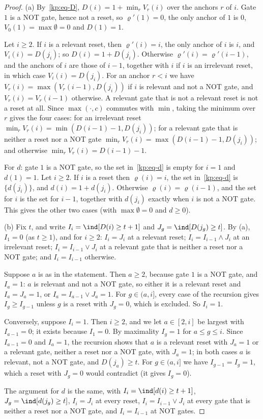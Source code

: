 \documentclass[11pt]{amsart}
\theoremstyle{definition}
\theoremstyle{remark}
\begin{document}
\begin{proof}
(a) By~\eqref{kp:eq-D}, $D(i)=1+\min_r V_r(i)$ over the anchors $r$ of $i$.
Gate $1$ is a NOT gate, hence not a reset, so $\varrho'(1)=0$, the only anchor
of $1$ is $0$, $V_0(1)=\max\emptyset=0$ and $D(1)=1$.

Let $i\ge 2$. If $i$ is a relevant reset, then $\varrho'(i)=i$, the only anchor
of $i$ is $i$, and $V_i(i)=D(j_i)$; so $D(i)=1+D(j_i)$. Otherwise
$\varrho'(i)=\varrho'(i-1)$, and the anchors of $i$ are those of $i-1$, together
with $i$ if $i$ is an irrelevant reset, in which case $V_i(i)=D(j_i)$. For an
anchor $r<i$ we have $V_r(i)=\max(V_r(i-1),D(j_i))$ if $i$ is relevant and not
a NOT gate, and $V_r(i)=V_r(i-1)$ otherwise. A relevant gate that is not a
relevant reset is not a reset at all. Since $\max(\cdot,c)$ commutes with
$\min$, taking the minimum over $r$ gives the four cases: for an irrelevant
reset $\min_r V_r(i)=\min(D(i-1)-1,D(j_i))$; for a relevant gate that is
neither a reset nor a NOT gate $\min_r V_r(i)=\max(D(i-1)-1,D(j_i))$; and
otherwise $\min_r V_r(i)=D(i-1)-1$.

For $d$: gate $1$ is a NOT gate, so the set in~\eqref{kp:eq-d} is empty for
$i=1$ and $d(1)=1$. Let $i\ge 2$. If $i$ is a reset then $\varrho(i)=i$, the
set in~\eqref{kp:eq-d} is $\{d(j_i)\}$, and $d(i)=1+d(j_i)$. Otherwise
$\varrho(i)=\varrho(i-1)$, and the set for $i$ is the set for $i-1$, together
with $d(j_i)$ exactly when $i$ is not a NOT gate. This gives the other two
cases (with $\max\emptyset=0$ and $d\ge 0$).

(b) Fix $t$, and write $I_i=\ind[D(i)\ge t+1]$ and $J_g=\ind[D(j_g)\ge t]$. By
(a), $I_1=0$ (as $t\ge 1$), and for $i\ge 2$:
$I_i=J_i$ at a relevant reset; $I_i=I_{i-1}\wedge J_i$ at an irrelevant reset;
$I_i=I_{i-1}\vee J_i$ at a relevant gate that is neither a reset nor a NOT
gate; and $I_i=I_{i-1}$ otherwise.

Suppose $a$ is as in the statement. Then $a\ge 2$, because gate $1$ is a NOT
gate, and $I_a=1$: $a$ is relevant and not a NOT gate, so either it is a
relevant reset and $I_a=J_a=1$, or $I_a=I_{a-1}\vee J_a=1$. For $g\in(a,i]$,
every case of the recursion gives $I_g\ge I_{g-1}$ unless $g$ is a reset with
$J_g=0$, which is excluded. So $I_i=1$.

Conversely, suppose $I_i=1$. Then $i\ge 2$, and we let $a\in[2,i]$ be largest
with $I_{a-1}=0$; it exists because $I_1=0$. By maximality $I_g=1$ for
$a\le g\le i$. Since $I_{a-1}=0$ and $I_a=1$, the recursion shows that $a$ is a
relevant reset with $J_a=1$ or a relevant gate, neither a reset nor a NOT gate,
with $J_a=1$; in both cases $a$ is relevant, not a NOT gate, and
$D(j_a)\ge t$. For $g\in(a,i]$ we have $I_{g-1}=I_g=1$, which a reset with
$J_g=0$ would contradict (it gives $I_g=0$).

The argument for $d$ is the same, with $I_i=\ind[d(i)\ge t+1]$,
$J_g=\ind[d(j_g)\ge t]$, $I_i=J_i$ at every reset, $I_i=I_{i-1}\vee J_i$ at
every gate that is neither a reset nor a NOT gate, and $I_i=I_{i-1}$ at NOT
gates.
\end{proof}
\end{document}
